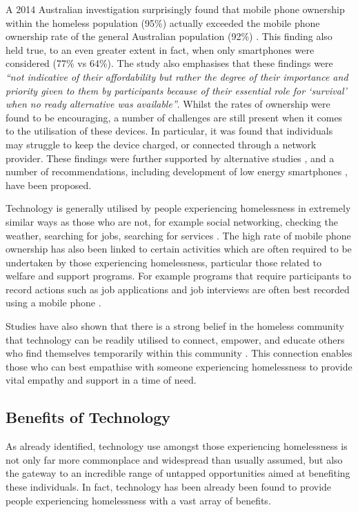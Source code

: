A 2014 Australian investigation surprisingly found that mobile phone ownership within the homeless population (95\%) actually exceeded the mobile phone ownership rate of the general Australian population (92\%) \cite{humphry2014importance}. This finding also held true, to an even greater extent in fact, when only smartphones were considered (77\% vs 64\%). The study also emphasises that these findings were \emph{“not indicative of their affordability but rather the degree of their importance and priority given to them by participants because of their essential role for ‘survival’ when no ready alternative was available”}. Whilst the rates of ownership were found to be encouraging, a number of challenges are still present when it comes to the utilisation of these devices. In particular, it was found that individuals may struggle to keep the device charged, or connected through a network provider. These findings were further supported by alternative studies \cite{raven2018mobile} \cite{woelfer2011artifacts}, and a number of recommendations, including development of low energy smartphones \cite{kinzer2014low}, have been proposed.

Technology is generally utilised by people experiencing homelessness in extremely similar ways as those who are not, for example social networking, checking the weather, searching for jobs, searching for services \cite{rhoades2017no} \cite{eyrich2011sheltered} \cite{woelfer2010homeless}. The high rate of mobile phone ownership has also been linked to certain activities which are often required to be undertaken by those experiencing homelessness, particular those related to welfare and support programs. For example programs that require participants to record actions such as job applications and job interviews are often best recorded using a mobile phone \cite{humphry2014importance}.

Studies have also shown that there is a strong belief in the homeless community that technology can be readily utilised to connect, empower, and educate others who find themselves temporarily within this community \cite{eyrich2011sheltered}. This connection enables those who can best empathise with someone experiencing homelessness to provide vital empathy and support in a time of need.

\subsection{Benefits of Technology}

As already identified, technology use amongst those experiencing homelessness is not only far more commonplace and widespread than usually assumed, but also the gateway to an incredible range of untapped opportunities aimed at benefiting these individuals. In fact, technology has been already been found to provide people experiencing homelessness with a vast array of benefits.

